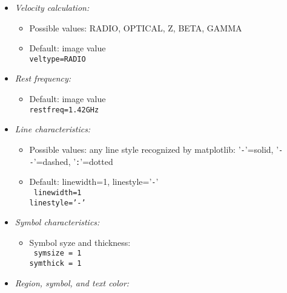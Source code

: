 \begin{itemize}
\begin{itemize}
{\tt corr=[X, Y]}

\end{itemize}



\item {\it Velocity calculation:}

\begin{itemize}

\item Possible values: RADIO, OPTICAL, Z, BETA, GAMMA
\item Default: image value\\

{\tt veltype=RADIO}

\end{itemize}

\item {\it Rest frequency:}

\begin{itemize}
\item Default: image value\\

{\tt restfreq=1.42GHz}

\end{itemize}

\item {\it Line characteristics:}

\begin{itemize}
\item Possible values: any line style recognized by matplotlib: '\verb=-='=solid, '\verb=--='=dashed, '\verb=:='=dotted
\item Default: linewidth=1, linestyle='\verb=-='\\

{\tt 
linewidth=1\\
linestyle='-'\\
}

\end{itemize}



\item {\it Symbol characteristics:}

\begin{itemize}
\item Symbol syze and thickness:\\

{\tt 
symsize = 1\\ 
symthick = 1
}
\end{itemize}

\item {\it Region, symbol, and text color:}
\begin{itemize}


\end{itemize}
\end{itemize}
